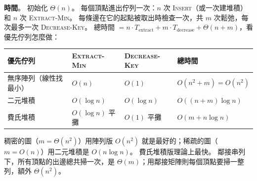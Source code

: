 \begin{pastsoln}
\textbf{時間}。 初始化 $\Theta(n)$。 每個頂點進出佇列一次：$n$ 次 \textsc{Insert}（或一次建堆積）和 $n$ 次
\textsc{Extract-Min}。 每條邊在它的起點被取出時檢查一次，共 $m$ 次鬆弛，每次最多一次 \textsc{Decrease-Key}。
總時間 $= n \cdot T_{\text{extract}} + m \cdot T_{\text{decrease}} + \Theta(n + m)$，看優先佇列怎麼做：
\begin{center}
\small
\begin{tabular}{llll}
\toprule
優先佇列 & \textsc{Extract-Min} & \textsc{Decrease-Key} & 總時間 \\
\midrule
無序陣列（線性找最小） & $O(n)$ & $O(1)$ & $O(n^2 + m) = O(n^2)$ \\
二元堆積 & $O(\log n)$ & $O(\log n)$ & $O((n + m)\log n)$ \\
費氏堆積 & $O(\log n)$ 平攤 & $O(1)$ 平攤 & $O(m + n \log n)$ \\
\bottomrule
\end{tabular}
\end{center}
稠密的圖（$m = \Theta(n^2)$）用陣列版 $O(n^2)$ 就是最好的；稀疏的圖（$m = O(n)$）用二元堆積是 $O(n \log n)$。
費氏堆積版理論上最快。 鄰接串列下，所有頂點的出邊總共掃一次，是 $\Theta(m)$；用鄰接矩陣則每個頂點要掃一整
列，額外 $\Theta(n^2)$。
\end{pastsoln}
